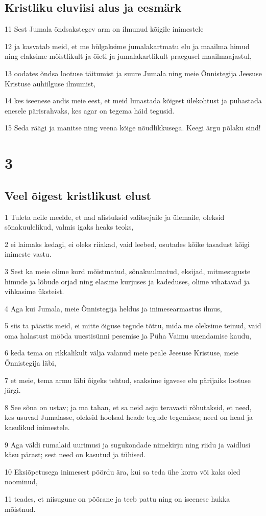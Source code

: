 \section*{Kristliku eluviisi alus ja eesmärk}

\par 11 Sest Jumala õndsakstegev arm on ilmunud kõigile inimestele
\par 12 ja kasvatab meid, et me hülgaksime jumalakartmatu elu ja maailma himud ning elaksime mõistlikult ja õieti ja jumalakartlikult praegusel maailmaajastul,
\par 13 oodates õndsa lootuse täitumist ja suure Jumala ning meie Õnnistegija Jeesuse Kristuse auhiilguse ilmumist,
\par 14 kes iseenese andis meie eest, et meid lunastada kõigest ülekohtust ja puhastada enesele pärisrahvaks, kes agar on tegema häid tegusid.
\par 15 Seda räägi ja manitse ning veena kõige nõudlikkusega. Keegi ärgu põlaku sind!


\chapter{3}

\section*{Veel õigest kristlikust elust}

\par 1 Tuleta neile meelde, et nad alistuksid valitsejaile ja ülemaile, oleksid sõnakuulelikud, valmis igaks heaks teoks,
\par 2 ei laimaks kedagi, ei oleks riiakad, vaid leebed, osutades kõike tasadust kõigi inimeste vastu.
\par 3 Sest ka meie olime kord mõistmatud, sõnakuulmatud, eksijad, mitmesuguste himude ja lõbude orjad ning elasime kurjuses ja kadeduses, olime vihatavad ja vihkasime üksteist.
\par 4 Aga kui Jumala, meie Õnnistegija heldus ja inimesearmastus ilmus,
\par 5 siis ta päästis meid, ei mitte õiguse tegude tõttu, mida me oleksime teinud, vaid oma halastust mööda uuestisünni pesemise ja Püha Vaimu uuendamise kaudu,
\par 6 keda tema on rikkalikult välja valanud meie peale Jeesuse Kristuse, meie Õnnistegija läbi,
\par 7 et meie, tema armu läbi õigeks tehtud, saaksime igavese elu pärijaiks lootuse järgi.
\par 8 See sõna on ustav; ja ma tahan, et sa neid asju teravasti rõhutaksid, et need, kes usuvad Jumalasse, oleksid hoolsad heade tegude tegemises; need on head ja kasulikud inimestele.
\par 9 Aga väldi rumalaid uurimusi ja sugukondade nimekirju ning riidu ja vaidlusi käsu pärast; sest need on kasutud ja tühised.
\par 10 Eksiõpetusega inimesest pöördu ära, kui sa teda ühe korra või kaks oled noominud,
\par 11 teades, et niisugune on pöörane ja teeb pattu ning on iseenese hukka mõistnud.

